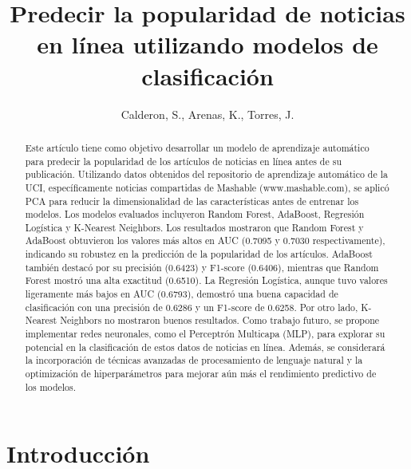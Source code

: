\documentclass[
  number,
  preprint,
  3p,
  twocolumn]{elsarticle}
\begin{document}
\begin{frontmatter}
\title{Predecir la popularidad de noticias en línea utilizando modelos
de clasificación}
\author[]{Calderon, S., Arenas, K., Torres, J.%
%
}




        
\begin{abstract}
Este artículo tiene como objetivo desarrollar un modelo de aprendizaje
automático para predecir la popularidad de los artículos de noticias en
línea antes de su publicación. Utilizando datos obtenidos del
repositorio de aprendizaje automático de la UCI, específicamente
noticias compartidas de Mashable (www.mashable.com), se aplicó PCA para
reducir la dimensionalidad de las características antes de entrenar los
modelos. Los modelos evaluados incluyeron Random Forest, AdaBoost,
Regresión Logística y K-Nearest Neighbors. Los resultados mostraron que
Random Forest y AdaBoost obtuvieron los valores más altos en AUC (0.7095
y 0.7030 respectivamente), indicando su robustez en la predicción de la
popularidad de los artículos. AdaBoost también destacó por su precisión
(0.6423) y F1-score (0.6406), mientras que Random Forest mostró una alta
exactitud (0.6510). La Regresión Logística, aunque tuvo valores
ligeramente más bajos en AUC (0.6793), demostró una buena capacidad de
clasificación con una precisión de 0.6286 y un F1-score de 0.6258. Por
otro lado, K-Nearest Neighbors no mostraron buenos resultados. Como
trabajo futuro, se propone implementar redes neuronales, como el
Perceptrón Multicapa (MLP), para explorar su potencial en la
clasificación de estos datos de noticias en línea. Además, se
considerará la incorporación de técnicas avanzadas de procesamiento de
lenguaje natural y la optimización de hiperparámetros para mejorar aún
más el rendimiento predictivo de los modelos.
\end{abstract}





\end{frontmatter}
    
\section{Introducción}\label{introducciuxf3n}
\end{document}
